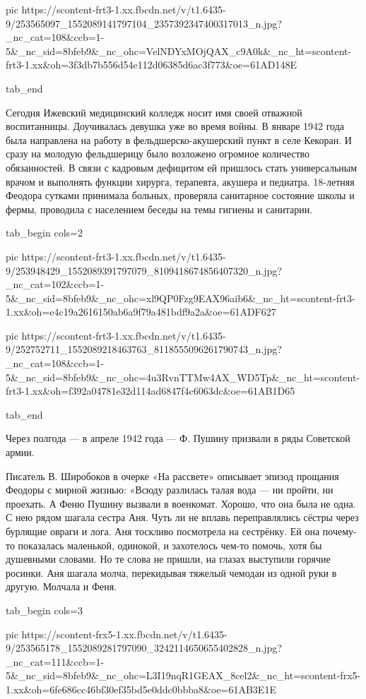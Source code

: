      pic https://scontent-frt3-1.xx.fbcdn.net/v/t1.6435-9/253565097_1552089141797104_2357392347400317013_n.jpg?_nc_cat=108&ccb=1-5&_nc_sid=8bfeb9&_nc_ohc=VelNDYxMOjQAX_c9A0k&_nc_ht=scontent-frt3-1.xx&oh=3f3db7b556d54e112d06385d6ac3f773&oe=61AD148E

  tab_end
\fi

Сегодня Ижевский медицинский колледж носит имя своей отважной воспитанницы.
Доучивалась девушка уже во время войны. В январе 1942 года была направлена на
работу в фельдшерско-акушерский пункт в селе Кекоран. И сразу на молодую
фельдшерицу было возложено огромное количество обязанностей. В связи с кадровым
дефицитом ей пришлось стать универсальным врачом и выполнять функции хирурга,
терапевта, акушера и педиатра. 18-летняя Феодора сутками принимала больных,
проверяла санитарное состояние школы и фермы, проводила с населением беседы на
темы гигиены и санитарии.

\ifcmt
  tab_begin cols=2

     pic https://scontent-frt3-1.xx.fbcdn.net/v/t1.6435-9/253948429_1552089391797079_8109418674856407320_n.jpg?_nc_cat=102&ccb=1-5&_nc_sid=8bfeb9&_nc_ohc=xl9QP0Fzg9EAX96aib6&_nc_ht=scontent-frt3-1.xx&oh=e4c19a2616150ab6a9f79a481bdf9a2a&oe=61ADF627

     pic https://scontent-frt3-1.xx.fbcdn.net/v/t1.6435-9/252752711_1552089218463763_8118555096261790743_n.jpg?_nc_cat=108&ccb=1-5&_nc_sid=8bfeb9&_nc_ohc=4u3RvnTTMw4AX_WD5Tp&_nc_ht=scontent-frt3-1.xx&oh=f392a04781e32d114ad6847f4c6063dc&oe=61AB1D65

  tab_end
\fi

Через полгода — в апреле 1942 года — Ф. Пушину призвали в ряды Советской армии.

Писатель В. Широбоков в очерке «На рассвете» описывает эпизод прощания Феодоры
с мирной жизнью: «Всюду разлилась талая вода — ни пройти, ни проехать. А Феню
Пушину вызвали в военкомат. Хорошо, что она была не одна. С нею рядом шагала
сестра Аня. Чуть ли не вплавь переправлялись сёстры через бурлящие овраги и
лога. Аня тоскливо посмотрела на сестрёнку. Ей она почему-то показалась
маленькой, одинокой, и захотелось чем-то помочь, хотя бы душевными словами. Но
те слова не пришли, на глазах выступили горячие росинки. Аня шагала молча,
перекидывая тяжелый чемодан из одной руки в другую. Молчала и Феня. 

\ifcmt
  tab_begin cols=3

     pic https://scontent-frx5-1.xx.fbcdn.net/v/t1.6435-9/253565178_1552089281797090_3242114650655402828_n.jpg?_nc_cat=111&ccb=1-5&_nc_sid=8bfeb9&_nc_ohc=L3I19nqR1GEAX_8cel2&_nc_ht=scontent-frx5-1.xx&oh=6fe686cc46bf30ef35bd5e0ddc0bbba8&oe=61AB3E1E

